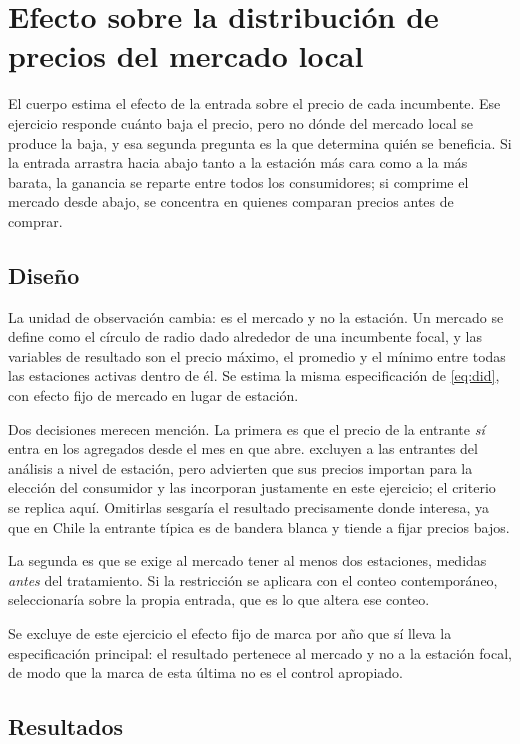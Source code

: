 \section{Efecto sobre la distribución de precios del mercado local}
\label{anexo:mercado}

El cuerpo estima el efecto de la entrada sobre el precio de cada incumbente. Ese
ejercicio responde cuánto baja el precio, pero no dónde del mercado local se
produce la baja, y esa segunda pregunta es la que determina quién se beneficia.
Si la entrada arrastra hacia abajo tanto a la estación más cara como a la más
barata, la ganancia se reparte entre todos los consumidores; si comprime el
mercado desde abajo, se concentra en quienes comparan precios antes de comprar.

\subsection{Diseño}

La unidad de observación cambia: es el mercado y no la estación. Un mercado se
define como el círculo de radio dado alrededor de una incumbente focal, y las
variables de resultado son el precio máximo, el promedio y el mínimo entre todas
las estaciones activas dentro de él. Se estima la misma especificación de
\eqref{eq:did}, con efecto fijo de mercado en lugar de estación.

Dos decisiones merecen mención. La primera es que el precio de la entrante
\emph{sí} entra en los agregados desde el mes en que abre. \textcite{FISCHER2025}
excluyen a las entrantes del análisis a nivel de estación, pero advierten que sus
precios importan para la elección del consumidor y las incorporan justamente en
este ejercicio; el criterio se replica aquí. Omitirlas sesgaría el resultado
precisamente donde interesa, ya que en Chile la entrante típica es de bandera
blanca y tiende a fijar precios bajos.

La segunda es que se exige al mercado tener al menos dos estaciones, medidas
\emph{antes} del tratamiento. Si la restricción se aplicara con el conteo
contemporáneo, seleccionaría sobre la propia entrada, que es lo que altera ese
conteo.

Se excluye de este ejercicio el efecto fijo de marca por año que sí lleva la
especificación principal: el resultado pertenece al mercado y no a la estación
focal, de modo que la marca de esta última no es el control apropiado.

\subsection{Resultados}

